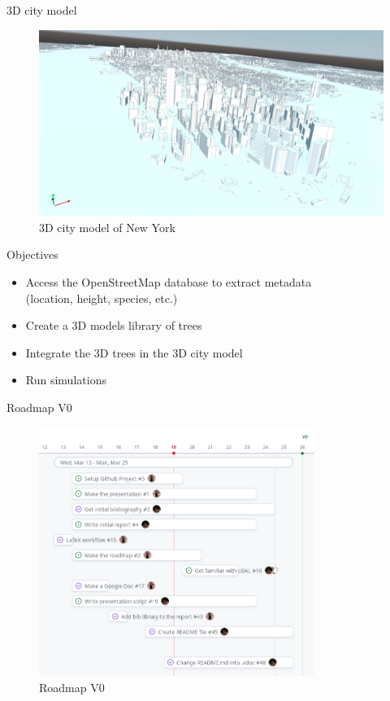 \documentclass[10pt]{beamer}
\begin{document}
\begin{frame}{3D city model}
  \begin{figure}[h] %
    \centering
    \includegraphics[width=1\textwidth]{images/NY_mesh.png}
    \caption{3D city model of New York \cite{NY-mesh}} %
    \label{fig:3d_city_model} %
  \end{figure} %
\end{frame}

\begin{frame}{Objectives}
  \begin{itemize}
    \item<1-> Access the OpenStreetMap database to extract metadata \\
    (location, height, species, etc.)
    \item<2-> Create a 3D models library of trees
    \item<3-> Integrate the 3D trees in the 3D city model
    \item<4-> Run simulations
  \end{itemize}
\end{frame}

\begin{frame}{Roadmap V0}
  \begin{figure}[h] %
    \centering
    \includegraphics[width=0.8\textwidth]{images/roadmap_v0.png}
    \caption{Roadmap V0} %
    \label{fig:roadmap_v0} %
    \end{figure}
\end{frame}
\end{document}
